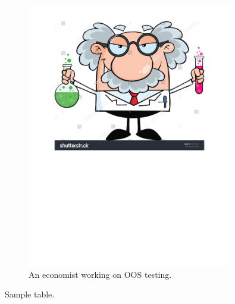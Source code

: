 \documentclass[12pt]{article}
\begin{document}
\setcounter{page}{43} %


\begin{figure}
  \centering
  \includegraphics[width=0.8\textwidth]{results/sample-image-1}
  \caption{An economist working on OOS testing.}
\end{figure}


\clearpage

\begin{table}
  \centering
  
  \caption{Sample table.}
\end{table}
\end{document}
